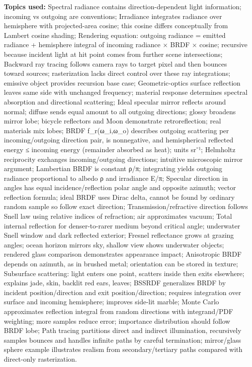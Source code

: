 \textbf{Topics used:} Spectral radiance contains direction-dependent light information; incoming vs outgoing are conventions; Irradiance integrates radiance over hemisphere with projected-area cosine; this cosine differs conceptually from Lambert cosine shading; Rendering equation: outgoing radiance = emitted radiance + hemisphere integral of incoming radiance × BRDF × cosine; recursive because incident light at hit point comes from further scene intersections; Backward ray tracing follows camera rays to target pixel and then bounces toward sources; rasterization lacks direct control over these ray integrations; emissive object provides recursion base case; Geometric-optics surface reflection leaves same side with unchanged frequency; material response determines spectral absorption and directional scattering; Ideal specular mirror reflects around normal; diffuse sends equal amount to all outgoing directions; glossy broadens mirror lobe; bicycle reflectors and Moon demonstrate retroreflection; real materials mix lobes; BRDF f\_r(ω\_i,ω\_o) describes outgoing scattering per incoming/outgoing direction pair, is nonnegative, and hemispherical reflected energy ≤ incoming energy (remainder absorbed as heat); units sr⁻¹; Helmholtz reciprocity exchanges incoming/outgoing directions; intuitive microscopic mirror argument; Lambertian BRDF is constant ρ/π; integrating yields outgoing radiance proportional to albedo ρ and irradiance E/π; Specular direction in angles has equal incidence/reflection polar angle and opposite azimuth; vector reflection formula; ideal BRDF uses Dirac delta, cannot be found by ordinary random sample so follow exact direction; Transmission/refractive direction follows Snell law using relative indices of refraction; air approximates vacuum; Total internal reflection for denser-to-rarer medium beyond critical angle; underwater Snell window and dark reflected exterior; Fresnel reflectance grows at grazing angles; ocean horizon mirrors sky, shallow view shows underwater objects; rendered glass comparison demonstrates appearance impact; Anisotropic BRDF depends on azimuth, as in brushed metal; orientation can be stored in texture; Subsurface scattering: light enters one point, scatters inside then exits elsewhere; explains jade, skin, backlit red ears, leaves; BSSRDF generalizes BRDF by incident position/direction and exit position/direction; requires integration over surface and incoming hemisphere; improves side-lit marble; Monte Carlo approximates reflection integral from random directions with integrand/PDF weighting; more samples reduce error; importance distribution should follow BRDF lobe; Path tracing partitions direct and indirect illumination, recursively samples bounces and handles infinite paths by careful termination; mirror/glass sphere example illustrates realism from secondary/tertiary paths compared with direct-only rasterization.

